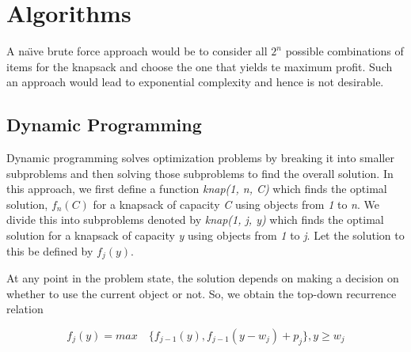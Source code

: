\documentclass{article}
\begin{document}
\section{Algorithms}
A na\"{\i}ve brute force approach would be to consider all $2^{n}$ possible combinations of items for the knapsack and choose the one that yields te maximum profit. Such an approach would lead to exponential complexity and hence is not desirable.
\subsection{Dynamic Programming}
Dynamic programming solves optimization problems by breaking it into smaller subproblems and then solving those subproblems to find the overall solution. \iffalse To solve a problem using dynamic programming, it should have two important characteristics:
\begin{itemize}
	\item \textit{Optimal Substructure}: This means that the overall optimal solution to a problem comprises optimal solutions to the subproblems.
	\item \textit{Overlapping Subproblems}: This means that any algorithm used to solve the problem should be solving a subset of the subproblems over and over again instead of generating new subproblems. Dynamic programming stores the results of these subproblems and uses them whenever the subproblem is encountered again. This is called \textit{memoization}.
\end{itemize}\fi
In this approach, we first define a function \textit{knap(1, n, C)} which finds the optimal solution, $f_{n}(C)$ for a knapsack of capacity \textit{C} using objects from \textit{1} to \textit{n}. We divide this into subproblems denoted by \textit{knap(1, j, y)} which finds the optimal solution for a knapsack of capacity \textit{y} using objects from \textit{1} to \textit{j}. Let the solution to this be defined by $f_{j}(y)$.

At any point in the problem state, the solution depends on making a decision on whether to use the current object or not. So, we obtain the top-down recurrence relation

\begin{equation} \label{eq:knapeq1}
	f_{j}(y) = max \quad \{f_{j-1}(y), f_{j-1}(y-w_{j}) + p_{j}\}, {y \ge w_{j}}
\end{equation}
\end{document}

